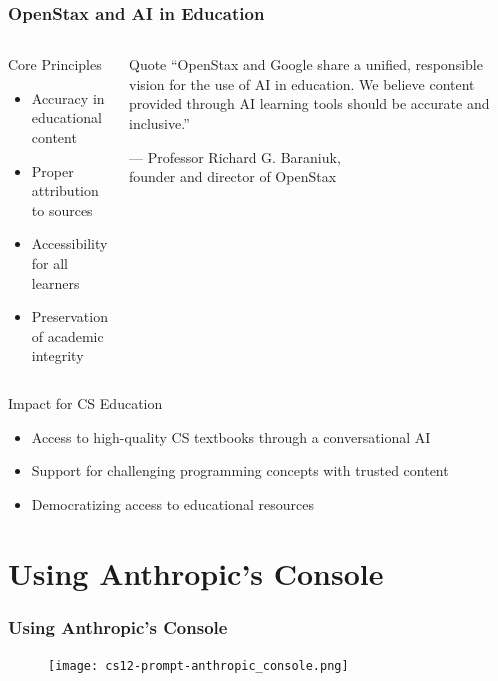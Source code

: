 \documentclass{beamer}
\begin{document}
\begin{frame}
\frametitle{OpenStax and AI in Education}

\begin{columns}
\begin{block}{Core Principles}
\begin{itemize}
\item Accuracy in educational content
\item Proper attribution to sources
\item Accessibility for all learners
\item Preservation of academic integrity
\end{itemize}
\end{block}

\begin{alertblock}{Quote}
\small ``OpenStax and Google share a unified, responsible vision for the use of AI in education. We believe content provided through AI learning tools should be accurate and inclusive.''
\begin{flushright}
\scriptsize — Professor Richard G. Baraniuk,\\founder and director of OpenStax
\end{flushright}
\end{alertblock}
\end{columns}

\vspace{0.5cm}
\begin{block}{Impact for CS Education}
\begin{itemize}
\item Access to high-quality CS textbooks through a conversational AI
\item Support for challenging programming concepts with trusted content
\item Democratizing access to educational resources
\end{itemize}
\end{block}
\end{frame}

\section{Using Anthropic's Console}
\frame{\sectionpage}

\begin{frame}
\frametitle{Using Anthropic's Console}
\begin{figure}
    \centering
    \texttt{[image: cs12-prompt-anthropic\_console.png]}
\end{figure}
\end{frame}
\end{document}
